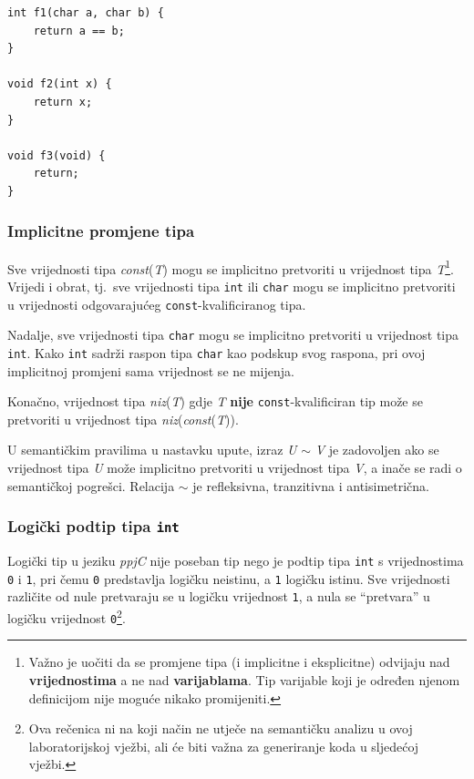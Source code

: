 \documentclass[times, 12pt, utf8]{book}
\begin{document}
\begin{lstlisting}[caption={Primjer jednostavne funkcije.},label=lst:primjer_tip_funkcije]
int f1(char a, char b) {
    return a == b;
}

void f2(int x) {
    return x;
}

void f3(void) {
    return;
}
\end{lstlisting}

\subsubsection{Implicitne promjene tipa}
Sve vrijednosti tipa \emph{const}(\emph{T}) mogu se implicitno pretvoriti u vrijednost tipa \emph{T}\footnote{Važno je uočiti da se promjene tipa (i implicitne i eksplicitne) odvijaju nad \textbf{vrijednostima} a ne nad \textbf{varijablama}. Tip varijable koji je određen njenom definicijom nije moguće nikako promijeniti.}.
Vrijedi i obrat, tj.~sve vrijednosti tipa \verb|int| ili \verb|char| mogu se implicitno pretvoriti u vrijednosti odgovarajućeg \verb|const|-kvalificiranog tipa.

Nadalje, sve vrijednosti tipa \verb|char| mogu se implicitno pretvoriti u vrijednost tipa \verb|int|.
Kako \verb|int| sadrži raspon tipa \verb|char| kao podskup svog raspona, pri ovoj implicitnoj promjeni sama vrijednost se ne mijenja.

Konačno, vrijednost tipa \emph{niz}(\emph{T}) gdje \emph{T} \textbf{nije} \verb|const|-kvalificiran tip može se pretvoriti u vrijednost tipa \emph{niz}(\emph{const}(\emph{T})).

U semantičkim pravilima u nastavku upute, izraz \emph{U} \(\sim\) \emph{V} je zadovoljen ako se vrijednost tipa \emph{U} može implicitno pretvoriti u vrijednost tipa \emph{V}, a inače se radi o semantičkoj pogrešci.
Relacija \(\sim\) je refleksivna, tranzitivna i antisimetrična.

\subsubsection{Logički podtip tipa \texttt{int}}
Logički tip u jeziku \emph{ppjC} nije poseban tip nego je podtip tipa \verb|int| s vrijednostima \verb|0| i \verb|1|, pri čemu \verb|0| predstavlja logičku neistinu, a \verb|1| logičku istinu.
Sve vrijednosti različite od nule pretvaraju se u logičku vrijednost \verb|1|, a nula se ``pretvara'' u logičku vrijednost \verb|0|\footnote{Ova rečenica ni na koji način ne utječe na semantičku analizu u ovoj laboratorijskoj vježbi, ali će biti važna za generiranje koda u sljedećoj vježbi.}.
\end{document}
